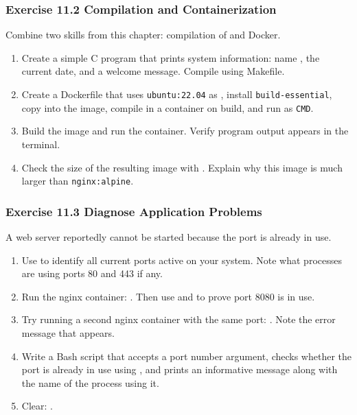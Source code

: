 \subsubsection*{Exercise 11.2 Compilation and Containerization}
Combine two skills from this chapter: compilation of  and Docker.
\begin{enumerate}
\item Create a simple C program that prints system information: name ,
the current date, and a welcome message. Compile using Makefile.
\item Create a Dockerfile that uses \texttt{ubuntu:22.04} as ,
install \texttt{build-essential}, copy  into the image, compile in a container on build, and run
 as \texttt{CMD}.
\item Build the image and run the container. Verify program output
appears in the terminal.
\item Check the size of the resulting image with .
Explain why this image is much larger than \texttt{nginx:alpine}.
\end{enumerate}

\subsubsection*{Exercise 11.3 Diagnose Application Problems}
A web server reportedly cannot be started because the port is already in use.
\begin{enumerate}
\item Use  to identify all current ports
active on your system. Note what processes are using ports 80 and 443 if any.
\item Run the nginx container: . Then use  and  to prove port 8080 is in use.
\item Try running a second nginx container with the same port:
.
Note the error message that appears.
\item Write a Bash script  that accepts a port number argument,
checks whether the port is already in use using , and prints an informative message along with the name of the process using it.
\item Clear: .
\end{enumerate}

